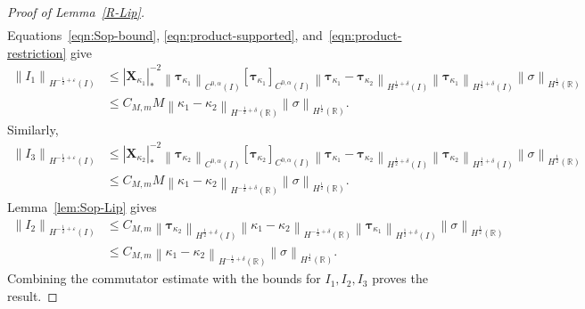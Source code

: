 \documentclass[11pt,reqno]{amsart}
\theoremstyle{plain}
\theoremstyle{definition}
\numberwithin{equation}{section}
\newcommand{\bm}[1]{\boldsymbol{#1}}
\newcommand{\abs}[1]{\left\lvert #1 \right\rvert}
\newcommand{\norm}[1]{\left\lVert #1 \right\rVert}
\newcommand{\R}{\mathbb{R}}
\newcommand{\tka}[1]{\bm\tau_{\kappa_{#1}}}
\newcommand{\xka}[1]{\bm X_{\kappa_{#1}}}
\newcommand{\ci}[1]{C^{#1}(I)}
\newcommand{\hi}[1]{H^{#1}(I)}
\newcommand{\hr}[1]{H^{#1}(\R)}
\begin{document}
\begin{proof}[Proof of Lemma~\ref{R-Lip}]
\begin{align}
\end{align}
Equations~\eqref{eqn:Sop-bound}, \eqref{eqn:product-supported}, and~\eqref{eqn:product-restriction} give
\begin{equation}
\begin{aligned}
    \norm{I_1}_{\hi{-\frac{1}{2}+\varepsilon}} &\le  \abs{\xka{1}}_*^{-2}\norm{\tka{1}}_{\ci{0,\alpha}}[\tka{1}]_{\ci{0,\alpha}} \norm{\tka{1}-\tka{2}}_{\hi{\frac{1}{2}+\delta}}\norm{\tka{1}}_{\hi{\frac{1}{2}+\delta}} \norm{\sigma}_{\hr{\frac{1}{2}}}\\
    &\le C_{M,m}M \norm{\kappa_1-\kappa_2}_{\hr{-\frac{1}{2}+\delta}}\norm{\sigma}_{\hr{\frac{1}{2}}}.
\end{aligned}
\end{equation}
Similarly,
\begin{equation}
\begin{aligned}
    \norm{I_3}_{\hi{-\frac{1}{2}+\varepsilon}} & \le  \abs{\xka{2}}_*^{-2}\norm{\tka{2}}_{\ci{0,\alpha}}[\tka{2}]_{\ci{0,\alpha}} \norm{\tka{1}-\tka{2}}_{\hi{\frac{1}{2}+\delta}}\norm{\tka{2}}_{\hi{\frac{1}{2}+\delta}} \norm{\sigma}_{\hr{\frac{1}{2}}}\\
    & \le C_{M,m}M \norm{\kappa_1-\kappa_2}_{\hr{-\frac{1}{2}+\delta}}\norm{\sigma}_{\hr{\frac{1}{2}}}.
\end{aligned}
\end{equation}
Lemma~\ref{lem:Sop-Lip} gives
\begin{equation}
\begin{aligned}
    \norm{I_2}_{\hi{-\frac{1}{2}+\varepsilon}} & \le C_{M,m} \norm{\tka{2}}_{\hi{\frac{1}{2}+\delta}} \norm{\kappa_1-\kappa_2}_{\hr{-\frac{1}{2}+\delta}} \norm{\tka{1}}_{\hi{\frac{1}{2}+\delta}} \norm{\sigma}_{\hr{\frac{1}{2}}} \\
    & \le C_{M,m} \norm{\kappa_1-\kappa_2}_{\hr{-\frac{1}{2}+\delta}} \norm{\sigma}_{\hr{\frac{1}{2}}}.
\end{aligned}
\end{equation}
Combining the commutator estimate with the bounds for $I_1,I_2,I_3$
proves the result.
\end{proof}
\end{document}
